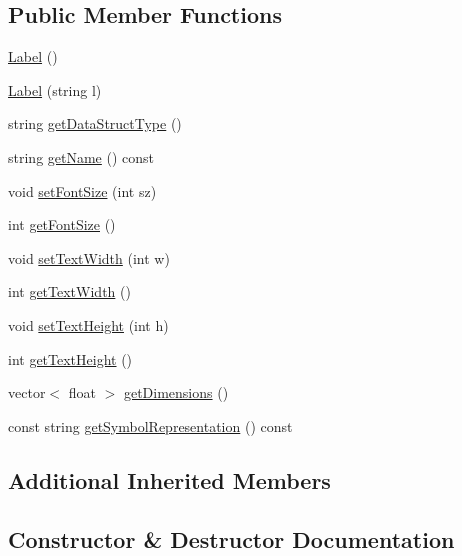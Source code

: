\subsection*{Public Member Functions}
\begin{DoxyCompactItemize}
\item 
\hyperlink{classbridges_1_1datastructure_1_1_label_abd73b3f555e6de007b7cb82cdf7c57cd}{Label} ()
\item 
\hyperlink{classbridges_1_1datastructure_1_1_label_a2eacf0820ea29c309f4910db5756607c}{Label} (string l)
\item 
string \hyperlink{classbridges_1_1datastructure_1_1_label_a55ccc4e52bd1f09c55ba6b775e7768ab}{get\+Data\+Struct\+Type} ()
\item 
string \hyperlink{classbridges_1_1datastructure_1_1_label_ac2a15e34404b9b7859e658da63a7020f}{get\+Name} () const
\item 
void \hyperlink{classbridges_1_1datastructure_1_1_label_aee5cc86a51a237c87e56db8e02d271b1}{set\+Font\+Size} (int sz)
\item 
int \hyperlink{classbridges_1_1datastructure_1_1_label_a200cc9710f28af2e63738d5166eaa51f}{get\+Font\+Size} ()
\item 
void \hyperlink{classbridges_1_1datastructure_1_1_label_a323af06f4536c644d6cc265b332b6ad0}{set\+Text\+Width} (int w)
\item 
int \hyperlink{classbridges_1_1datastructure_1_1_label_ab97fecf82c0c21f870f4dc25b6244099}{get\+Text\+Width} ()
\item 
void \hyperlink{classbridges_1_1datastructure_1_1_label_acd095180b94bad422f7c26182680a958}{set\+Text\+Height} (int h)
\item 
int \hyperlink{classbridges_1_1datastructure_1_1_label_aeaf64e048094d69e11e77563c598a045}{get\+Text\+Height} ()
\item 
vector$<$ float $>$ \hyperlink{classbridges_1_1datastructure_1_1_label_ac8f5e0d05c8f4466b3bf07e1fa342091}{get\+Dimensions} ()
\item 
const string \hyperlink{classbridges_1_1datastructure_1_1_label_aa3b7c9e5630ecc8a2534e6db2a220e90}{get\+Symbol\+Representation} () const
\end{DoxyCompactItemize}
\subsection*{Additional Inherited Members}


\subsection{Constructor \& Destructor Documentation}
\mbox{\label{classbridges_1_1datastructure_1_1_label_abd73b3f555e6de007b7cb82cdf7c57cd}} 

